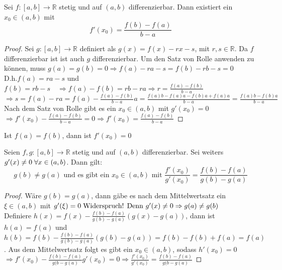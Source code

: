 \documentclass[a4paper,titlepage,oneside]{article}
\def\R{\ensuremath{\mathbb{R}} }
\def\WSP{\text{Widerspruch! }}
\def\sp{\hspace{0,1cm}}
\theoremstyle{thmstyle}
\begin{document}
\begin{satz}
Sei $f : [a,b] \to \R $ stetig und auf $(a,b)$ differenzierbar. Dann existiert ein $x_0 \in (a,b)$ mit \[f'(x_0) = \frac{f(b) - f(a)}{b-a}\]
\begin{proof}
Sei $g: [a,b]\to \R$ definiert als $g(x) = f(x) - rx - s$, mit $r,s \in \R$. Da $f$ differenzierbar ist ist auch $g$ differenzierbar. Um den Satz von Rolle anwenden zu können, muss $g(a) = g(b) = 0 \Rightarrow f(a) - r a - s = f(b) - r b - s = 0 $\\
D.h.$  f(a) = r a - s $ und $ f(b) = r b - s \quad \Rightarrow f(a) - f(b) = rb - ra \Rightarrow r = \frac{f(a) - f(b)}{b - a}$ \\
$\Rightarrow s = f(a) - ra = f(a) -  \frac{f(a) - f(b)}{b - a} a = \frac{f(a) b - f(a) a - f(b) a + f(a) a}{b-a} = \frac{f(a)b - f(b)a}{b - a}$\\
Nach dem Satz von Rolle gibt es ein $x_0 \in (a,b)$ mit $g'(x_0) = 0$\\
$\Rightarrow f'(x_0) -  \frac{f(a) - f(b)}{b - a} = 0 \Rightarrow f'(x_0) =  \frac{f(a) - f(b)}{b - a}$
\end{proof}
\end{satz}

\begin{bem}[Spezialfall]
Ist $f(a) = f(b)$, dann ist $f'(x_0) = 0$
\end{bem}

\begin{korr}
Seien $f,g:[a,b] \to \R$ stetig und auf $(a,b)$ differenzierbar. Sei weiters $g'(x) \ne 0 \sp \forall x \in (a,b)$. Dann gilt:
\[g(b) \ne g(a) \text{ und es gibt ein } x_0 \in (a,b) \text{ mit } \frac{f'(x_0)}{g'(x_0)} = \frac{f(b) - f(a)}{g(b) - g(a)}\]
\begin{proof}
Wäre $g(b) = g(a)$, dann gäbe es nach dem Mittelwertsatz ein $\xi \in (a,b)$ mit $g'(\xi) = 0 \sp \WSP \\
\text{Denn $g'(x) \ne 0$} \Rightarrow g(a) \ne g(b)$\\
Definiere $h(x)  = f(x) - \frac{f(b) - f(a)}{g(b) - g(a)}(g(x) - g(a))$, dann ist $h(a) = f(a)$ und $h(b) = f(b) - \frac{f(b) - f(a)}{g(b) - g(a)}(g(b) - g(a)) = f(b) - f(b) + f(a) = f(a)$. Aus dem Mittelwertsatz folgt es gibt ein $x_0 \in (a,b) $, sodass $h'(x_0) = 0 $  \\
$\Rightarrow  f'(x_0) - \frac{f(b) - f(a)}{g(b - g(a)}g'(x_0) = 0 \Rightarrow \frac{f'(x_0)}{g'(x_0)} = \frac{f(b) - f(a)}{g(b - g(a)}$
\end{proof}
\end{korr}
\end{document}
